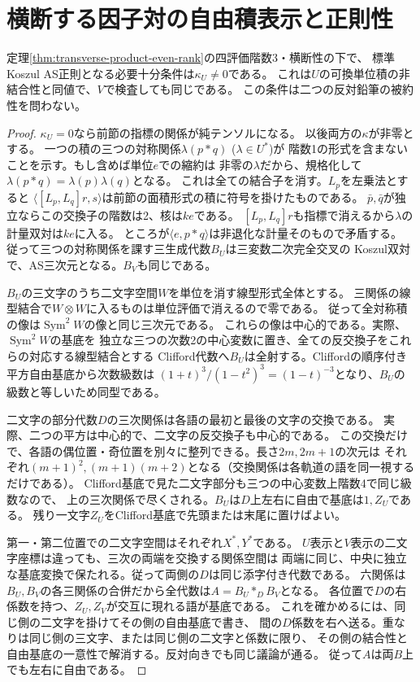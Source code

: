 \section{横断する因子対の自由積表示と正則性}
\label{sec:transverse-factor-amalgam}
\begin{theorem}[横断する二平面での完全判定]\label{thm:transverse-factor-amalgam}
定理\ref{thm:transverse-product-even-rank}の四評価階数3・横断性の下で、
標準Koszul AS正則となる必要十分条件は$\kappa_U\ne0$である。
これは$U$の可換単位積の非結合性と同値で、$V$で検査しても同じである。
この条件は二つの反対鉛筆の被約性を問わない。
\end{theorem}
\begin{proof}
$\kappa_U=0$なら前節の指標の関係が純テンソルになる。
以後両方の$\kappa$が非零とする。
一つの積の三つの対称関係$\lambda(p*q)$ ($\lambda\in U^*$)が
階数1の形式を含まないことを示す。もし含めば単位$e$での縮約は
非零の$\lambda$だから、規格化して$\lambda(p*q)=\lambda(p)\lambda(q)$となる。
これは全ての結合子を消す。$L_p$を左乗法とすると
$\langle [L_p,L_q]r,s\rangle$は前節の面積形式の積に符号を掛けたものである。
$\bar p,\bar q$が独立ならこの交換子の階数は2、核は$ke$である。
$[L_p,L_q]r$も指標で消えるから$\lambda$の計量双対は$ke$に入る。
ところが$\langle e,p*q\rangle$は非退化な計量そのもので矛盾する。
従って三つの対称関係を課す三生成代数$B_U$は三変数二次完全交叉の
Koszul双対で、AS三次元となる。$B_V$も同じである。

$B_U$の三文字のうち二文字空間$W$を単位を消す線型形式全体とする。
三関係の線型結合で$W\otimes W$に入るものは単位評価で消えるので零である。
従って全対称積の像は$\operatorname{Sym}^2 W$の像と同じ三次元である。
これらの像は中心的である。実際、$\operatorname{Sym}^2 W$の基底を
独立な三つの次数2の中心変数に置き、全ての反交換子をこれらの対応する線型結合とする
Clifford代数へ$B_U$は全射する。Cliffordの順序付き平方自由基底から次数級数は
$(1+t)^3/(1-t^2)^3=(1-t)^{-3}$となり、$B_U$の級数と等しいため同型である。

二文字の部分代数$D$の三次関係は各語の最初と最後の文字の交換である。
実際、二つの平方は中心的で、二文字の反交換子も中心的である。
この交換だけで、各語の偶位置・奇位置を別々に整列できる。長さ$2m,2m+1$の次元は
それぞれ$(m+1)^2,(m+1)(m+2)$となる（交換関係は各軌道の語を同一視するだけである）。
Clifford基底で見た二文字部分も三つの中心変数上階数4で同じ級数なので、
上の三次関係で尽くされる。$B_U$は$D$上左右に自由で基底は$1,Z_U$である。
残り一文字$Z_U$をClifford基底で先頭または末尾に置けばよい。

第一・第二位置での二文字空間はそれぞれ$X^*,Y^*$である。
$U$表示と$V$表示の二文字座標は違っても、三次の両端を交換する関係空間は
両端に同じ、中央に独立な基底変換で保たれる。従って両側の$D$は同じ添字付き代数である。
六関係は$B_U,B_V$の各三関係の合併だから全代数は$A=B_U *_D B_V$となる。
各位置で$D$の右係数を持つ、$Z_U,Z_V$が交互に現れる語が基底である。
これを確かめるには、同じ側の二文字を掛けてその側の自由基底で書き、
間の$D$係数を右へ送る。重なりは同じ側の三文字、または同じ側の二文字と係数に限り、
その側の結合性と自由基底の一意性で解消する。反対向きでも同じ議論が通る。
従って$A$は両$B$上でも左右に自由である。


\end{proof}
